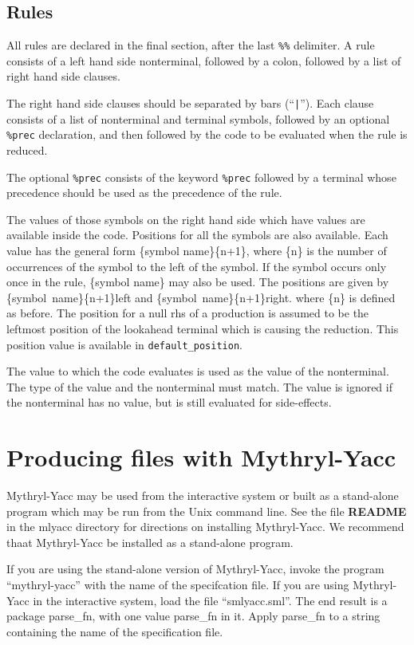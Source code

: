 \subsection{Rules}

All rules are declared in the final section, after the last {\tt \%\%}
delimiter.  A rule consists of a left hand side nonterminal, followed by
a colon, followed by a list of right hand side clauses. 

The right hand side clauses should be separated by bars (``{\tt |}'').  Each
clause consists of a list of nonterminal and terminal symbols, followed
by an optional {\tt \%prec} declaration, and then followed by the code to be
evaluated when the rule is reduced.

The optional {\tt \%prec} consists of the keyword {\tt \%prec} followed by a 
terminal whose precedence should be used as the precedence of the
rule.

The values of those symbols on the right hand side which have values are 
available inside the code.  Positions for all the symbols are also
available.
Each value has the general form \{symbol name\}\{n+1\}, where \{n\} is the 
number of occurrences of the symbol to the left of the symbol.  If
the symbol occurs only once in the rule, \{symbol name\} may also 
be used.
The positions are given by \{symbol~name\}\{n+1\}left and
\{symbol~name\}\{n+1\}right.  where \{n\} is defined as before.
The position for a null rhs of
a production is assumed to be the leftmost position of the lookahead
terminal which is causing the reduction. This position value is
available in {\tt default_position}.

The value to which the code evaluates is used as the value of the
nonterminal.  The type of the value and the nonterminal must match.
The value is ignored if the nonterminal has no value, but is still
evaluated for side-effects.

\section{Producing files with Mythryl-Yacc}

Mythryl-Yacc may be used from the interactive system or built as a
stand-alone program which may be run from the Unix command line.
See the file {\bf README} in the mlyacc directory for directions
on installing Mythryl-Yacc.  We recommend thaat Mythryl-Yacc be installed as
a stand-alone program.

If you are using the stand-alone version of Mythryl-Yacc, invoke the
program ``mythryl-yacc'' with the name of the specifcation file.
If you are using  Mythryl-Yacc in the interactive system, load the file
``smlyacc.sml''.  The end result is a package parse_fn, with one
value parse_fn in it.  Apply parse_fn to a string containing the
name of the specification file.

